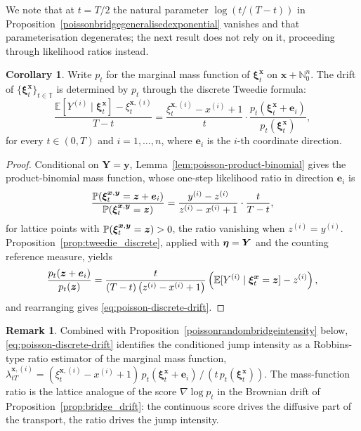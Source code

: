 \documentclass{article}
\def\P{\mathbb{P}}
\def\E{\mathbb{E}}
\def\xib{\boldsymbol{\xi}}
\theoremstyle{definition}
\newtheorem{corollary}[proposition]{Corollary}
\newtheorem{remark}[proposition]{Remark}
\begin{document}
We note that at $t = T/2$ the natural parameter $\log(t/(T-t))$ in Proposition~\ref{poissonbridgegeneralisedexponential} vanishes and that parameterisation degenerates; the next result does not rely on it, proceeding through likelihood ratios instead.

\begin{corollary}\label{poissondiscretetweedie}
Write $p_t$ for the marginal mass function of $\boldsymbol{\xi}^{\boldsymbol{x}}_t$ on $\boldsymbol{x} + \mathbb{N}_0^n$. The drift of $\{\boldsymbol{\xi}^{\boldsymbol{x}}_t\}_{t \in \mathbb{T}}$ is determined by $p_t$ through the discrete Tweedie formula:
    \begin{equation}\label{eq:poisson-discrete-drift}
        \frac{\mathbb{E}[Y^{(i)} \mid \xib^{\boldsymbol{x}}_t ] - \xi^{\boldsymbol{x},(i)}_t}{T-t} = \frac{\xi^{\boldsymbol{x},(i)}_t - x^{(i)} + 1}{t} \cdot \frac{p_t(\boldsymbol{\xi}^{\boldsymbol{x}}_t + \boldsymbol{e}_i)}{p_t(\boldsymbol{\xi}^{\boldsymbol{x}}_t)},
    \end{equation}
    for every $t \in (0,T)$ and $i = 1, \dots, n$, where $\boldsymbol{e}_i$ is the $i$-th coordinate direction.
\end{corollary}
\begin{proof}
    Conditional on $\boldsymbol{Y} = \boldsymbol{y}$, Lemma~\ref{lem:poisson-product-binomial} gives the product-binomial mass function, whose one-step likelihood ratio in direction $\boldsymbol{e}_i$ is
    \begin{equation*}
        \frac{\P(\xib^{\boldsymbol{x},\boldsymbol{y}}_t = \bfz + \boldsymbol{e}_i)}{\P(\xib^{\boldsymbol{x},\boldsymbol{y}}_t = \bfz)}
        = \frac{y^{(i)} - z^{(i)}}{z^{(i)} - x^{(i)} + 1} \cdot \frac{t}{T-t},
    \end{equation*}
    for lattice points with $\P(\xib^{\boldsymbol{x},\boldsymbol{y}}_t = \bfz) > 0$, the ratio vanishing when $z^{(i)} = y^{(i)}$. Proposition~\ref{prop:tweedie_discrete}, applied with $\boldsymbol{\eta} = \boldsymbol{Y}$ and the counting reference measure, yields
    \begin{equation*}
        \frac{p_t(\bfz + \boldsymbol{e}_i)}{p_t(\bfz)}
        = \frac{t}{(T-t)\left(z^{(i)} - x^{(i)} + 1\right)} \left(\E[Y^{(i)} \mid \xib^{\boldsymbol{x}}_t = \bfz] - z^{(i)}\right),
    \end{equation*}
    and rearranging gives \eqref{eq:poisson-discrete-drift}.
\end{proof}
\begin{remark}
    Combined with Proposition~\ref{poissonrandombridgeintensity} below, \eqref{eq:poisson-discrete-drift} identifies the conditioned jump intensity as a Robbins-type ratio estimator of the marginal mass function,
    $\lambda^{\boldsymbol{x},(i)}_{tT} = (\xi^{\boldsymbol{x},(i)}_t - x^{(i)} + 1)\, p_t(\boldsymbol{\xi}^{\boldsymbol{x}}_t + \boldsymbol{e}_i)\,/\,(t\, p_t(\boldsymbol{\xi}^{\boldsymbol{x}}_t))$.
    The mass-function ratio is the lattice analogue of the score $\nabla \log p_t$ in the Brownian drift of Proposition~\ref{prop:bridge_drift}: the continuous score drives the diffusive part of the transport, the ratio drives the jump intensity.
\end{remark}
\end{document}
